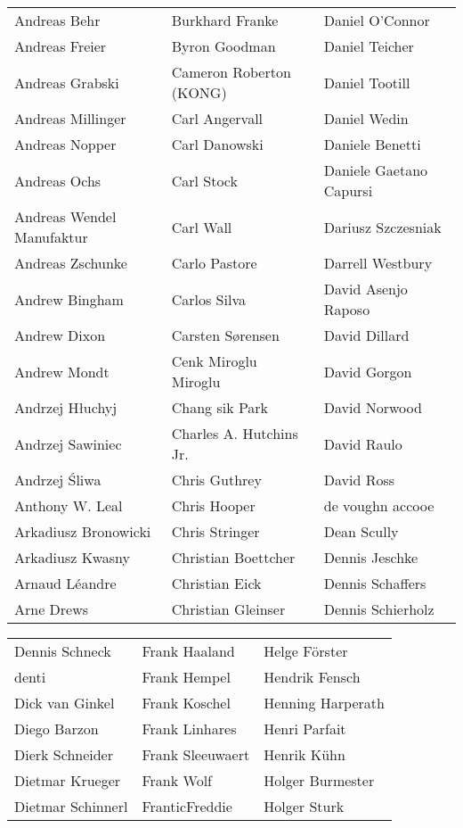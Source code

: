 \begin{small}
\begin{tabular}{p{4cm}p{4cm}p{4cm}}
Andreas Behr & Burkhard Franke & Daniel O'Connor \\
Andreas Freier & Byron Goodman & Daniel Teicher \\
Andreas Grabski & Cameron Roberton (KONG) & Daniel Tootill \\
Andreas Millinger & Carl Angervall & Daniel Wedin \\
Andreas Nopper & Carl Danowski & Daniele Benetti \\
Andreas Ochs & Carl Stock & Daniele Gaetano Capursi \\
Andreas Wendel Manufaktur & Carl Wall & Dariusz Szczesniak \\
Andreas Zschunke & Carlo Pastore & Darrell Westbury \\
Andrew Bingham & Carlos Silva & David Asenjo Raposo \\
Andrew Dixon & Carsten Sørensen & David Dillard \\
Andrew Mondt & Cenk Miroglu Miroglu & David Gorgon \\
Andrzej Hłuchyj & Chang sik Park & David Norwood \\
Andrzej Sawiniec & Charles A. Hutchins Jr. & David Raulo \\
Andrzej Śliwa & Chris Guthrey & David Ross \\
Anthony W. Leal & Chris Hooper & de voughn accooe \\
Arkadiusz Bronowicki & Chris Stringer & Dean Scully \\
Arkadiusz Kwasny & Christian Boettcher & Dennis Jeschke \\
Arnaud Léandre & Christian Eick & Dennis Schaffers \\
Arne Drews & Christian Gleinser & Dennis Schierholz \\
\end{tabular}
\newpage
\setlength{\tabcolsep}{1mm}
\begin{tabular}{p{4cm}p{4cm}p{4cm}}
Dennis Schneck & Frank Haaland & Helge Förster \\
denti & Frank Hempel & Hendrik Fensch \\
Dick van Ginkel & Frank Koschel & Henning Harperath \\
Diego Barzon & Frank Linhares & Henri Parfait \\
Dierk Schneider & Frank Sleeuwaert & Henrik Kühn \\
Dietmar Krueger & Frank Wolf & Holger Burmester \\
Dietmar Schinnerl & FranticFreddie & Holger Sturk \\

\end{tabular}
\end{small}

